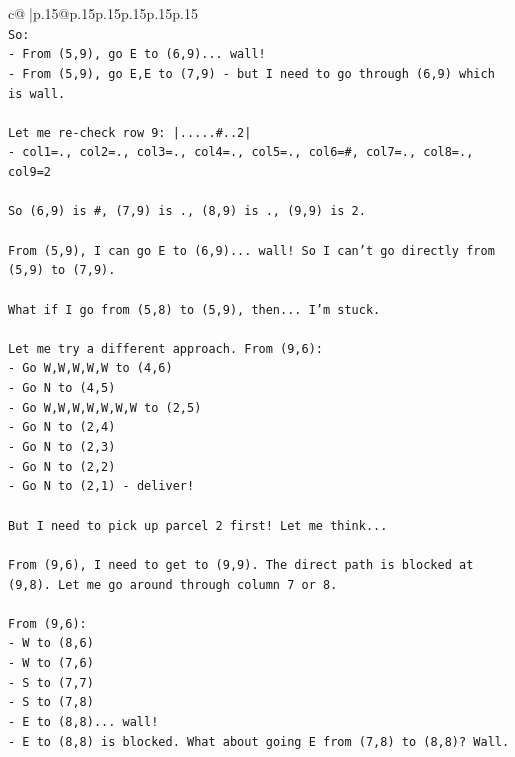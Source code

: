 \documentclass{article}
\begin{document}
{\begin{supertabular}{c@{$\;$}|p{.15\linewidth}@{}p{.15\linewidth}p{.15\linewidth}p{.15\linewidth}p{.15\linewidth}p{.15\linewidth}}
{{{\\ 
\texttt{So:} \\
\texttt{{-} From (5,9), go E to (6,9)... wall!} \\
\texttt{{-} From (5,9), go E,E to (7,9) {-} but I need to go through (6,9) which is wall.} \\
\\ 
\texttt{Let me re{-}check row 9: |.....\#..2|} \\
\texttt{{-} col1=., col2=., col3=., col4=., col5=., col6=\#, col7=., col8=., col9=2} \\
\\ 
\texttt{So (6,9) is \#, (7,9) is ., (8,9) is ., (9,9) is 2.} \\
\\ 
\texttt{From (5,9), I can go E to (6,9)... wall! So I can't go directly from (5,9) to (7,9).} \\
\\ 
\texttt{What if I go from (5,8) to (5,9), then... I'm stuck.} \\
\\ 
\texttt{Let me try a different approach. From (9,6):} \\
\texttt{{-} Go W,W,W,W,W to (4,6)} \\
\texttt{{-} Go N to (4,5)} \\
\texttt{{-} Go W,W,W,W,W,W,W to (2,5)} \\
\texttt{{-} Go N to (2,4)} \\
\texttt{{-} Go N to (2,3)} \\
\texttt{{-} Go N to (2,2)} \\
\texttt{{-} Go N to (2,1) {-} deliver!} \\
\\ 
\texttt{But I need to pick up parcel 2 first! Let me think...} \\
\\ 
\texttt{From (9,6), I need to get to (9,9). The direct path is blocked at (9,8). Let me go around through column 7 or 8.} \\
\\ 
\texttt{From (9,6):} \\
\texttt{{-} W to (8,6)} \\
\texttt{{-} W to (7,6)} \\
\texttt{{-} S to (7,7)} \\
\texttt{{-} S to (7,8)} \\
\texttt{{-} E to (8,8)... wall!} \\
\texttt{{-} E to (8,8) is blocked. What about going E from (7,8) to (8,8)? Wall.} \\
}}}
\end{supertabular}}
\end{document}
